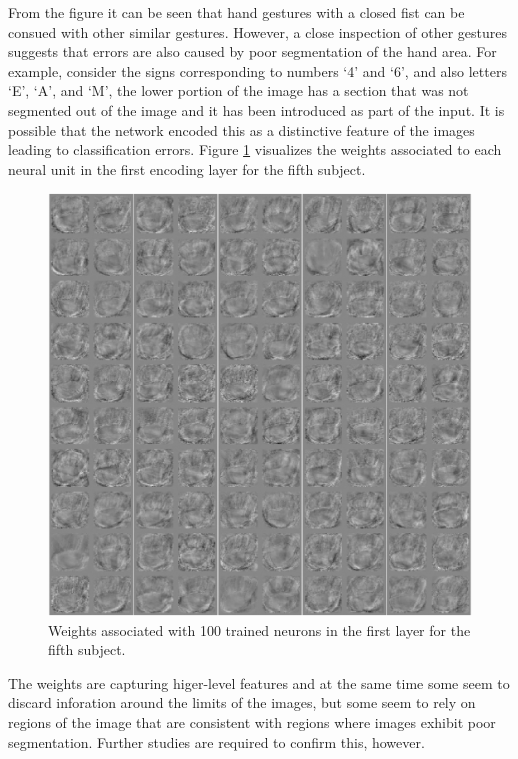 \documentclass[a4paper]{article}
\begin{document}
From the figure it can be seen that hand gestures
with a closed fist can be consued with other similar gestures. However, a close
inspection of other gestures suggests that errors are also caused by poor
segmentation of the hand area. For example, consider the signs corresponding to
numbers `4' and `6', and also letters `E', `A', and `M', the lower portion of
the image has a section that was not segmented out of the image and it has been
introduced as part of the input. It is possible that the network encoded this
as a distinctive feature of the images leading to classification errors. 
Figure \ref{fig:weights} visualizes the weights associated to each neural
unit in the first encoding layer for the fifth subject. 
\begin{figure}
\centering
\includegraphics[width=12.2cm]{img/weightsS05.eps}
\caption{Weights associated with 100 trained neurons in the first layer for the
fifth subject.}
\label{fig:weights}
\end{figure}
The weights are capturing higer-level
features and at the same time some seem to discard inforation around the limits
of the images, but some seem to rely on regions of the image that are
consistent with regions where images exhibit poor segmentation. Further studies
are required to confirm this, however.
\end{document}
